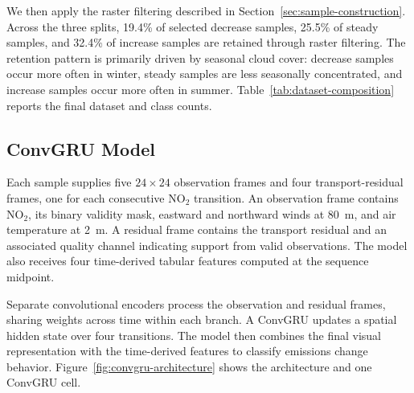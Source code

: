 \documentclass[sigconf,nonacm]{acmart}
\begin{document}
We then apply the raster filtering described in
Section~\ref{sec:sample-construction}. Across the three splits, 19.4\% of
selected decrease samples, 25.5\% of steady samples, and 32.4\% of increase
samples are retained through raster filtering. The retention pattern is
primarily driven by seasonal cloud cover: decrease samples occur more often in
winter, steady samples are less seasonally concentrated, and increase samples
occur more often in summer.
Table~\ref{tab:dataset-composition} reports the final dataset and class counts.

\subsection{ConvGRU Model}

Each sample supplies five $24\times24$ observation frames and four
transport-residual frames, one for each consecutive NO$_2$ transition. An
observation frame contains NO$_2$, its binary validity mask, eastward and northward
winds at 80~m, and air temperature at 2~m. A residual frame contains the transport
residual and an associated quality channel indicating support from valid observations. The model also receives four time-derived tabular
features computed at the sequence midpoint.

Separate convolutional encoders process the observation and residual frames,
sharing weights across time within each branch. A ConvGRU updates a spatial
hidden state over four transitions. The model then combines the final visual
representation with the time-derived features to classify emissions change
behavior. Figure~\ref{fig:convgru-architecture} shows the architecture and one
ConvGRU cell.
\end{document}
